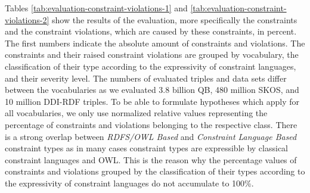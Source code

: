 \documentclass[conference]{IEEEtran}
\newcommand{\tb}[1]{\todo[size=\small, color=green!40]{\textbf{Thomas:} #1}}
\begin{document}
Tables \ref{tab:evaluation-constraint-violations-1} and \ref{tab:evaluation-constraint-violations-2} show the results of the evaluation, more specifically the constraints and the constraint violations, which are caused by these constraints, in percent. The first numbers indicate the absolute amount of constraints and violations. The constraints and their raised constraint violations are grouped by vocabulary, the classification of their type according to the expressivity of constraint languages, and their severity level.
The numbers of evaluated triples and data sets differ between the vocabularies
as we evaluated 3.8 billion QB, 480 million SKOS, and 10 million DDI-RDF triples.
To be able to formulate hypotheses which apply for all vocabularies, 
we only use normalized relative values representing the percentage of constraints and violations belonging to the respective class. There is a strong overlap between \emph{RDFS/OWL Based} and \emph{Constraint Language Based} constraint types as in many cases constraint types are expressible by classical constraint languages and OWL. This is the reason why the percentage values of constraints and violations grouped by the classification of their types according to the expressivity of constraint languages do not accumulate to 100\%. 

\end{document}
